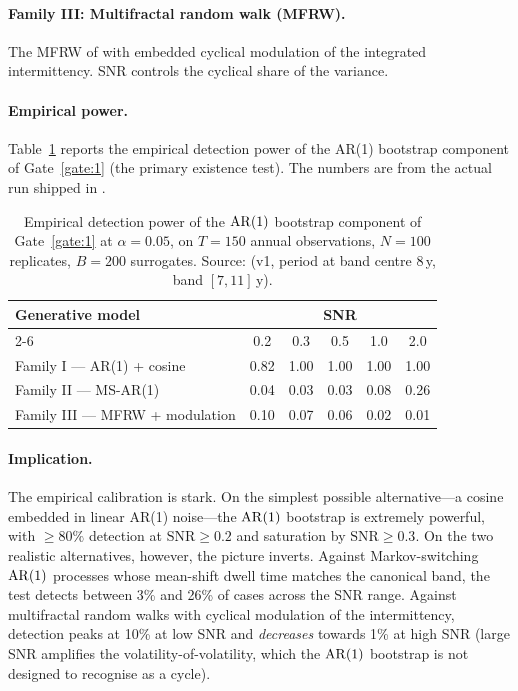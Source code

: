 \paragraph{Family III: Multifractal random walk (MFRW).}
The MFRW of \citet{bacry_muzy_delour2001} with embedded
cyclical modulation of the integrated intermittency. SNR
controls the cyclical share of the variance.

\paragraph{Empirical power.}
Table~\ref{tab:power} reports the empirical detection power of
the AR(1) bootstrap component of Gate~\ref{gate:1} (the primary
existence test). The numbers are from the actual run shipped in
.

\begin{table}[h]
\centering
\caption{Empirical detection power of the \(\mathrm{AR}(1)\) bootstrap
component of Gate~\ref{gate:1} at \(\alpha=0.05\), on \(T=150\)
annual observations, \(N=100\) replicates, \(B=200\) surrogates.
Source:  (v1, period at band
centre 8\,y, band \([7,11]\)\,y).}
\label{tab:power}
\small
\begin{tabularx}{\linewidth}{@{}X c c c c c@{}}
\toprule
\textbf{Generative model} & \multicolumn{5}{c}{\textbf{SNR}} \\
\cmidrule(l){2-6}
   & 0.2 & 0.3 & 0.5 & 1.0 & 2.0 \\
\midrule
Family I --- AR(1) + cosine      & 0.82 & 1.00 & 1.00 & 1.00 & 1.00 \\
Family II --- MS-AR(1)           & 0.04 & 0.03 & 0.03 & 0.08 & 0.26 \\
Family III --- MFRW + modulation & 0.10 & 0.07 & 0.06 & 0.02 & 0.01 \\
\bottomrule
\end{tabularx}
\end{table}

\paragraph{Implication.}
The empirical calibration is stark. On the simplest possible
alternative---a cosine embedded in linear AR(1) noise---the
\(\mathrm{AR}(1)\) bootstrap is extremely powerful, with \(\geq 80\%\)
detection at \(\mathrm{SNR}\geq 0.2\) and saturation by
\(\mathrm{SNR}\geq 0.3\). On the two realistic alternatives,
however, the picture inverts. Against Markov-switching
\(\mathrm{AR}(1)\) processes whose mean-shift dwell time matches the
canonical band, the test detects between 3\% and 26\% of cases
across the SNR range. Against multifractal random walks with
cyclical modulation of the intermittency, detection peaks at
10\% at low SNR and \emph{decreases} towards 1\% at high SNR
(large SNR amplifies the volatility-of-volatility, which the
\(\mathrm{AR}(1)\) bootstrap is not designed to recognise as a cycle).

